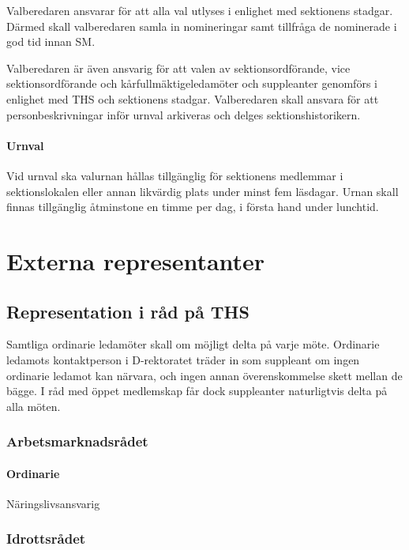 \documentclass{dgovdoc}
\begin{document}
Valberedaren ansvarar för att alla val utlyses i enlighet med sektionens
stadgar. Därmed skall valberedaren samla in nomineringar samt tillfråga de
nominerade i god tid innan SM.

Valberedaren är även ansvarig för att valen av sektionsordförande, vice
sektionsordförande och kårfullmäktigeledamöter och suppleanter genomförs i
enlighet med THS och sektionens stadgar. Valberedaren skall ansvara för att
personbeskrivningar inför urnval arkiveras och delges sektionshistorikern.

\paragraph{Urnval}

Vid urnval ska valurnan hållas tillgänglig för sektionens medlemmar i
sektionslokalen eller annan likvärdig plats under minst fem läsdagar. Urnan
skall finnas tillgänglig åtminstone en timme per dag, i första hand under
lunchtid.

\section{Externa representanter}

\subsection{Representation i råd på THS}

Samtliga ordinarie ledamöter skall om möjligt delta på varje möte. Ordinarie
ledamots kontaktperson i D-rektoratet träder in som suppleant om ingen
ordinarie ledamot kan närvara, och ingen annan överenskommelse skett mellan de
bägge. I råd med öppet medlemskap får dock suppleanter naturligtvis delta på
alla möten.

\subsubsection{Arbetsmarknadsrådet}

\paragraph{Ordinarie}

Näringslivsansvarig

\subsubsection{Idrottsrådet}
\end{document}
